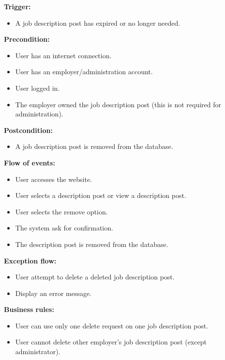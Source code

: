 \documentclass[a4paper]{article}
\begin{document}
        \textbf{Trigger:}
        \begin{itemize}
            \item A job description post has expired or no longer needed.
        \end{itemize}

        \textbf{Precondition:}
        \begin{itemize}
            \item User has an internet connection.
            \item User has an employer/administration account.
            \item User logged in.
            \item The employer owned the job description post (this is not required for administration).
        \end{itemize}

        \textbf{Postcondition:}
        \begin{itemize}
            \item A job description post is removed from the database.
        \end{itemize}
        
        \textbf{Flow of events:}
        \begin{itemize}
            \item User accesses the website.
            \item User selects a description post or view a description post.
            \item User selects the remove option.
            \item The system ask for confirmation.
            \item The description post is removed from the database.
        \end{itemize}

        \textbf{Exception flow:}
        \begin{itemize}
            \item User attempt to delete a deleted job description post.
            \item Display an error message.
        \end{itemize}

        \textbf{Business rules:}
        \begin{itemize}
            \item User can use only one delete request on one job description post.
            \item User cannot delete other employer's job description post (except administrator).
        \end{itemize}
\end{document}
